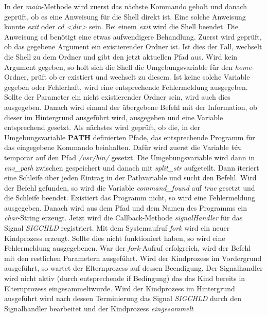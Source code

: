 \documentclass{ti2}
\begin{document}
In der \textit{main}-Methode wird zuerst das nächste Kommando geholt und danach geprüft, ob es eine Anweisung für die Shell direkt ist. Eine solche Anweisung könnte \textit{exit} oder \textit{cd <dir>} sein. Bei einem \textit{exit} wird die Shell beendet. Die Anweisung cd benötigt eine etwas aufwendigere Behandlung. Zuerst wird geprüft, ob das gegebene Argument ein existierender Ordner ist. Ist dies der Fall, wechselt die Shell zu dem Ordner und gibt den jetzt aktuellen Pfad aus. Wird kein Argument gegeben, so holt sich die Shell die Umgebungsvariable für den \textit{home}-Ordner, prüft ob er existiert und wechselt zu diesem. Ist keine solche Variable gegeben oder Fehlerhaft, wird eine entsprechende Fehlermeldung ausgegeben. Sollte der Parameter ein nicht existierender Ordner sein, wird auch dies ausgegeben. Danach wird einmal der übergebene Befehl mit der Information, ob dieser im Hintergrund ausgeführt wird, ausgegeben und eine Variable entsprechend gesetzt. Als nächstes wird geprüft, ob die, in der Umgebungsvariable \textbf{PATH} definierten Pfade, das entsprechende Programm für das eingegebene Kommando beinhalten. Dafür wird zuerst die Variable \textit{bin} temporär auf den Pfad \textit{/usr/bin/} gesetzt. Die Umgebungsvariable wird dann in \textit{env\_path} zwischen gespeichert und danach mit \textit{split\_str} aufgeteilt. Dann iteriert eine Schleife über jeden Eintrag in der Pathvariable und sucht den Befehl. Wird der Befehl gefunden, so wird die Variable \textit{command\_found} auf \textit{true} gesetzt und die Schleife beendet.
Existiert das Programm nicht, so wird eine Fehlermeldung ausgegeben. Danach wird aus dem Pfad und dem Namen des Programms ein \textit{char}-String erzeugt. Jetzt wird die Callback-Methode \textit{signalHandler} für das Signal \textit{SIGCHLD} registriert. Mit dem Systemaufruf \textit{fork} wird ein neuer Kindprozess erzeugt. Sollte dies nicht funktioniert haben, so wird eine Fehlermeldung ausgegebenen. War der \textit{fork}-Aufruf erfolgreich, wird der Befehl mit den restlichen Parametern ausgeführt. Wird der Kindprozess im Vordergrund ausgeführt, so wartet der Elternprozess auf dessen Beendigung. Der Signalhandler wird nicht aktiv (durch entsprechende if Bedingung) das das Kind bereits in Elternprozess \glqq eingesammelt\grqq wurde.  Wird der Kindprozess im Hintergrund ausgeführt wird nach dessen Terminierung das Signal \textit{SIGCHLD} durch den Signalhandler bearbeitet und der Kindprozess \textit{eingesammelt}
\newpage
\end{document}
